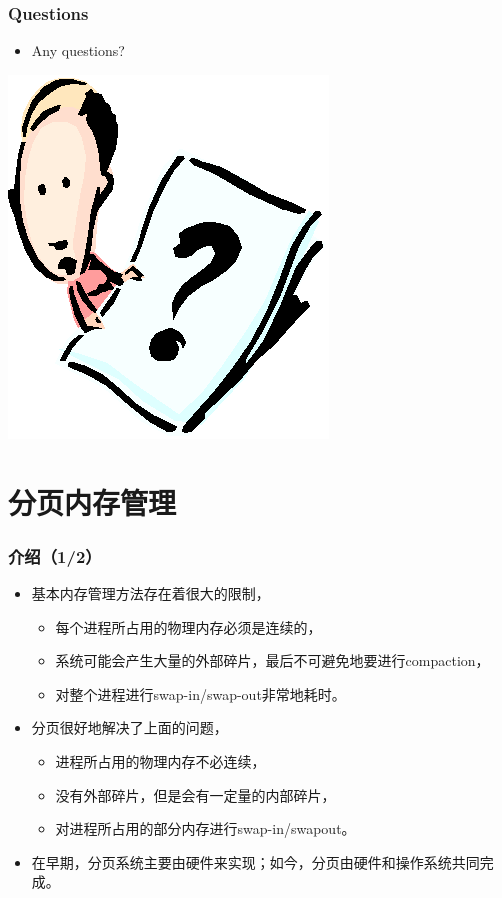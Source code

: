 \documentclass[CJKutf8,xcolor=pdftex,dvipsnames,table]{beamer}
\begin{document}
\begin{CJK*}{UTF8}{song}
  \begin{frame}
  \frametitle{Questions}
  \begin{itemize}
  \item{Any questions?}
  \end{itemize}
  \begin{center}
    \includegraphics[scale=.5]{question}
  \end{center}
  \end{frame}
  
\section{分页内存管理}

  \begin{frame}
  \frametitle{介绍（1/2）} \pause
  \begin{itemize}
  \item{基本内存管理方法存在着很大的限制，} \pause
    \begin{itemize}
    \item{每个进程所占用的物理内存必须是连续的，} \pause
    \item{系统可能会产生大量的外部碎片，最后不可避免地要进行compaction，} \pause
    \item{对整个进程进行swap-in/swap-out非常地耗时。} \pause
    \end{itemize}
  \item{分页很好地解决了上面的问题，} \pause
    \begin{itemize}
    \item{进程所占用的物理内存不必连续，} \pause
    \item{没有外部碎片，但是会有一定量的内部碎片，} \pause
    \item{对进程所占用的部分内存进行swap-in/swapout。} \pause
    \end{itemize}
  \item{在早期，分页系统主要由硬件来实现；如今，分页由硬件和操作系统共同完成。}
  \end{itemize}
  \end{frame}
  

\end{CJK*}
\end{document}
